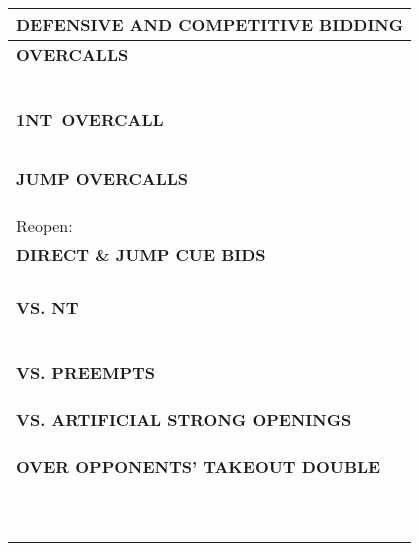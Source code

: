 \documentclass{article}
\newcommand\N{{\footnotesize NT}}
\begin{document}
\noindent
\small{
\begin{minipage}{90mm}
	\begin{tabular}{| p{88mm} |}
		\hline
		\cellcolor[gray]{0.9} \textbf{DEFENSIVE AND COMPETITIVE BIDDING} \\ \hline
		\textbf{OVERCALLS} \\ \hline
		\\ \hline
		\\ \hline
		\\ \hline
		\\ \hline
		\\ \hline
		\\ \hline
		\textbf{1\N \ OVERCALL} \\ \hline
		\\ \hline
		\\ \hline
		\\ \hline
		\\ \hline
		\\ \hline
		\textbf{JUMP OVERCALLS} \\ \hline
		\\ \hline
		\\ \hline
		\\ \hline
		Reopen: \\ \hline
		\textbf{DIRECT \& JUMP CUE BIDS} \\ \hline
		\\ \hline
		\\ \hline
		\\ \hline
		\\ \hline
		\textbf{VS. NT} \\ \hline
		\\ \hline
		\\ \hline
		\\ \hline
		\\ \hline
		\\ \hline
		\\ \hline
		\textbf{VS. PREEMPTS} \\ \hline
		\\ \hline
		\\ \hline
		\\ \hline
		\textbf{VS. ARTIFICIAL STRONG OPENINGS} \\ \hline
		\\ \hline
		\\ \hline
		\\ \hline
		\textbf{OVER OPPONENTS' TAKEOUT DOUBLE} \\ \hline
		\\ \hline
		\\ \hline
		\\ \hline
		\\ \hline
		\\ \hline
		\\ \hline
		\\ \hline
		\\ \hline
		\\ \hline
		\\ \hline
	\end{tabular}
\end{minipage}
}
\end{document}
